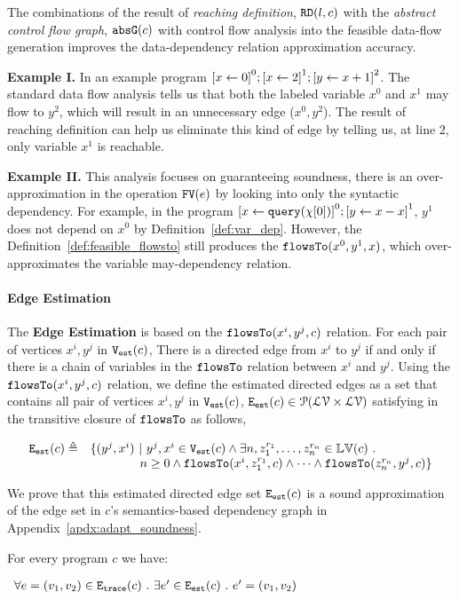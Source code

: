 The combinations of the result of \emph{reaching definition}, $\mathtt{RD}(l, c)$
with the \emph{abstract control flow graph}, $\mathtt{abs}{\mathtt{G}}(c)$ with control flow analysis into the feasible 
data-flow generation improves the data-dependency relation approximation accuracy. 

\textbf{Example I.}
In an example program $\clabel{\assign{x}{0}}^{0}; \clabel{\assign{x}{2}}^{1}; \clabel{\assign{y}{x + 1}}^{2}$. 
The standard data flow analysis 
tells us that both the labeled variable $x^{0}$ and $x^1$ may flow to $y^{2}$, which will result in an unnecessary edge ($x^{0}, y^{2}$). The result of reaching definition 
can help us eliminate this kind of edge by telling us, at line $2$, only variable $x^{1}$ is reachable. 

\textbf{Example II.}
This analysis focuses on guaranteeing soundness,
there is an over-approximation in the operation $\mathtt{FV}(e)$ by looking into only the syntactic dependency.
For example, in the program 
$\clabel{\assign{x}{\query(\chi[0])}}^{0}; \clabel{\assign{y}{x - x}}^{1}$,
$y^1$ does not depend on $x^0$ by Definition~\ref{def:var_dep}.
However, the Definition~\ref{def:feasible_flowsto} still produces the $\mathtt{flowsTo}(x^0, y^1, x)$, which over-approximates the variable may-dependency relation.

\paragraph{Edge Estimation}
The \textbf{Edge Estimation}
is based on the $\mathtt{flowsTo}(x^i, y^j, c)$ relation.
For each pair of vertices $x^i, y^j$ in $\mathtt{{V_{est}}}(c)$,
There is a directed edge from $x^i$ to $y^j$ if and only if there is a chain of variables 
in the $\mathtt{flowsTo}$ relation between $x^i$ and $y^j$. 
Using the $\mathtt{flowsTo}(x^i, y^j, c)$ relation, we define the estimated directed edges as a set that contains all
pair of vertices $x^i, y^j$ in $\mathtt{{V_{est}}}(c)$, 
$\mathtt{{E_{est}}}(c) \in \mathcal{P}( \mathcal{LV} \times \mathcal{LV})$
satisfying in the transitive closure of $\mathtt{flowsTo}$ as follows,

\[
 \begin{array}{ll}
 \mathtt{{E_{est}}}(c) \triangleq &
 \{ 
 (y^j, x^i) ~ \vert ~ y^j, x^i \in \mathtt{{V_{est}}}(c)
 \land
 \exists n,
 z_1^{r_1}, \ldots, z_n^{r_n} \in \mathbb{LV}(c) ~.~ 
 \\ & \qquad \qquad
 n \geq 0 \land \mathtt{flowsTo}(x^i, z_1^{r_1}, c) 
 \land \cdots \land \mathtt{flowsTo}(z_n^{r_n}, y^j, c) 
 \}
 \end{array}
 \]

 We prove that this estimated directed edge set $\mathtt{{E_{est}}}(c)$ is a sound approximation of the 
edge set in $c$'s semantics-based dependency graph 
in Appendix~\ref{apdx:adapt_soundness}.
\begin{lem}
 For every program $c$ we have:
 \begin{center}
$
 \begin{array}{l}
 \forall e = (v_1, v_2) \in \mathtt{{E_{trace}}}(c)
 ~.~ 
 \exists e' \in \mathtt{{E_{est}}}(c) ~.~ e' = (v_1, v_2)
 \end{array}
$
\end{center} 
\end{lem}

